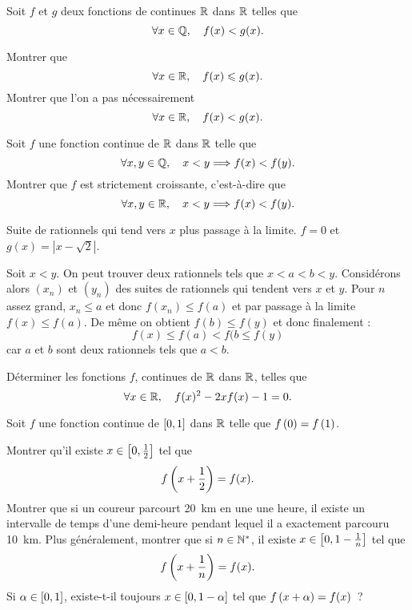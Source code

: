 \documentclass{magnolia}
\begin{document}
\begin{questions}
\question Soit $f$ et $g$ deux fonctions de continues $\mathbb{R}$ dans $\mathbb{R}$ telles
  que
  \[\forall x\in\mathbb{Q} ,\quad f(x)<g(x).\]
  \begin{questions}
  \question Montrer que
    \[\forall x\in\mathbb{R} ,\quad f(x)\leqslant g(x).\]
  \question Montrer que l'on a pas nécessairement
    \[\forall x\in\mathbb{R} ,\quad f(x)<g(x).\]
  \end{questions}
\question Soit $f$ une fonction continue de $\mathbb{R}$ dans $\mathbb{R}$ telle que
  \[\forall x,y\in\mathbb{Q} ,\quad x<y \Longrightarrow f(x)<f(y).\]
  Montrer que $f$ est strictement croissante, c'est-à-dire que
  \[\forall x,y\in\mathbb{R} ,\quad x<y \Longrightarrow f(x)<f(y).\]
\end{questions}

\begin{sol}
\begin{questions}
\question 
  \begin{questions}
  \question Suite de rationnels qui tend vers $x$ plus passage à la limite.
  \question $f=0$ et $g(x)=|x-\sqrt{2}|$.
  \end{questions}
\question Soit $x<y$. On peut trouver deux rationnels tels que $x<a<b<y$. Considérons alors $(x_n)$ et $(y_n)$ des suites de rationnels qui tendent vers $x$ et $y$. Pour $n$ assez grand, $x_n\leq a$ et donc $f(x_n)\leq f(a)$ et par passage à la limite $f(x)\leq f(a)$. De même on obtient $f(b)\leq f(y)$ et donc finalement :
$$f(x)\leq f(a)<f(b \leq f(y)$$ car $a$ et $b$ sont deux rationnels tels que $a<b$.
\end{questions}

\end{sol}


Déterminer les fonctions $f$, continues de $\mathbb{R}$ dans $\mathbb{R}$, telles que
\[\forall x\in\mathbb{R} ,\quad f(x)^2-2xf(x)-1=0.\]

Soit $f$ une fonction continue de $\left[0,1\right]$ dans $\mathbb{R}$ telle que
$f\left(0\right)=f\left(1\right)$.
\begin{questions}
\question Montrer qu'il existe $x\in\left[0,\frac{1}{2}\right]$ tel que
  \[f\left(x+\frac{1}{2}\right)=f(x).\]
\question 
  Montrer que si un coureur parcourt 20~km en une
  une heure, il existe un intervalle de temps d'une demi-heure pendant lequel
  il a exactement parcouru 10~km.
\question Plus généralement, montrer que si $n\in{\mathbb{N}^*}$, il existe
  $x\in\left[0,1-\frac{1}{n}\right]$ tel que
  \[f\left(x+\frac{1}{n}\right)=f(x).\]
\question Si $\alpha\in\left[0,1\right]$, existe-t-il toujours
  $x\in\left[0,1-\alpha\right]$ tel que $f\left(x+\alpha\right)=f(x)$~?
\end{questions}
\end{document}
